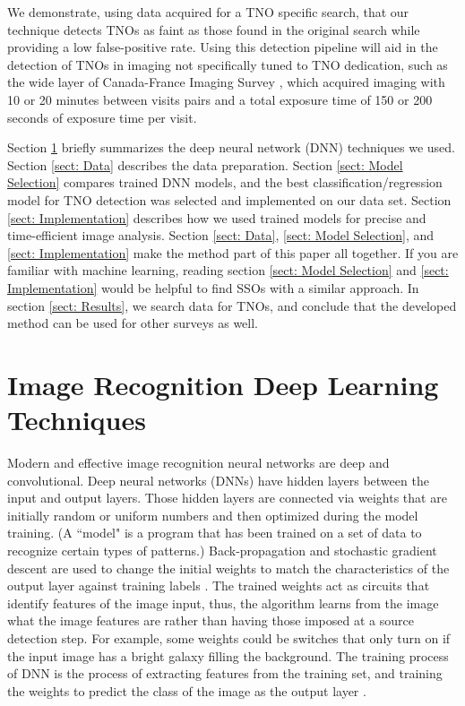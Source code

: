 \documentclass{aastex631}
\begin{document}
We demonstrate, using data acquired for a TNO specific search, that our technique detects TNOs as faint as those found in the original search while providing a low false-positive rate.
Using this detection pipeline will aid in the detection of TNOs in imaging not specifically tuned to TNO dedication, such as the wide layer of Canada-France Imaging Survey \citep{2017ApJ...848..128I}, which acquired imaging with 10 or 20 minutes between visits pairs and a total exposure time of 150 or 200 seconds of exposure time per visit.

Section \ref{sect: Techniques} briefly summarizes the deep neural network (DNN) techniques we used.
Section \ref{sect: Data} describes the data preparation.
Section \ref{sect: Model Selection} compares trained DNN models, and the best classification/regression model for TNO detection was selected and implemented on our data set.
Section \ref{sect: Implementation} describes how we used trained models for precise and time-efficient image analysis.
Section \ref{sect: Data}, \ref{sect: Model Selection}, and \ref{sect: Implementation} make the method part of this paper all together.
If you are familiar with machine learning, reading section \ref{sect: Model Selection} and \ref{sect: Implementation} would be helpful to find SSOs with a similar approach.
In section \ref{sect: Results}, we search data for TNOs, and conclude that the developed method can be used for other surveys as well.

\section{Image Recognition Deep Learning Techniques}
\label{sect: Techniques}
Modern and effective image recognition neural networks are deep and convolutional. 
Deep neural networks (DNNs) have hidden layers between the input and output layers.
Those hidden layers are connected via weights that are initially random or uniform numbers and then optimized during the model training. 
(A ``model" is a program that has been trained on a set of data to recognize certain types of patterns.)
Back-propagation and stochastic gradient descent are used to change the initial weights to match the characteristics of the output layer against training labels \citep{lecun1988theoretical, bottou2012stochastic}.
The trained weights act as circuits that identify features of the image input, thus, the algorithm learns from the image what the image features are rather than having those imposed at a source detection step. 
For example, some weights could be switches that only turn on if the input image has a bright galaxy filling the background. 
The training process of DNN is the process of extracting features from the training set, and training the weights to predict the class of the image as the output layer \citep{fukushima1983neocognitron}.
\end{document}
